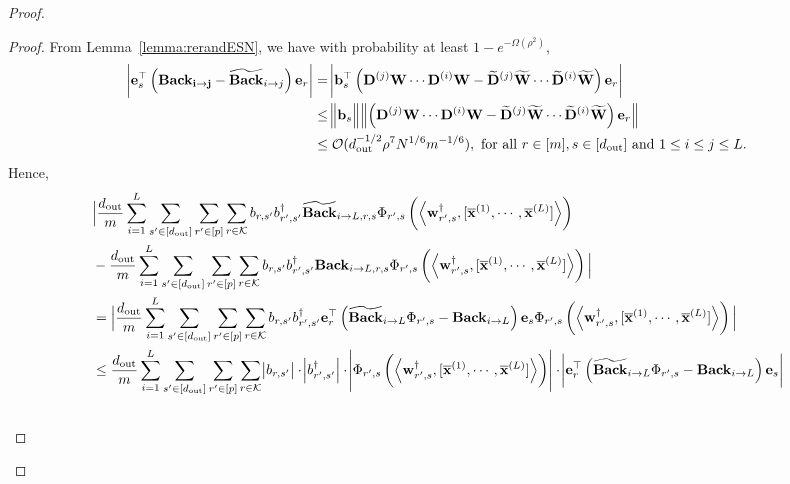 \begin{claim}
\begin{proof}
				\begin{proof}
					From Lemma~\ref{lemma:rerandESN}, we have with probability at least $1 - e^{-\Omega(\rho^2)}$,
					\begin{align*}
						\abs{\mathbf{e}_s^{\top} \left(\mathbf{Back_{i \to j}} - \widetilde{\mathbf{Back}}_{i \to j} \right) \mathbf{e}_r} 
						&= \abs{\mathbf{b}_s^{\top} \left( \mathbf{D}^{(j)} \mathbf{W} \cdots \mathbf{D}^{(i)} \mathbf{W} - \widetilde{\mathbf{D}}^{(j)} \widetilde{\mathbf{W}} \cdots \widetilde{\mathbf{D}}^{(i)} \widetilde{\mathbf{W}} \right) \mathbf{e}_r}
						\\&
						\le \norm[2]{\mathbf{b}_s} \norm[2]{\left( \mathbf{D}^{(j)} \mathbf{W} \cdots \mathbf{D}^{(i)} \mathbf{W} - \widetilde{\mathbf{D}}^{(j)} \widetilde{\mathbf{W}} \cdots \widetilde{\mathbf{D}}^{(i)} \widetilde{\mathbf{W}} \right) \mathbf{e}_r}
						\\&\le \mathcal{O}(d_{\mathrm{out}} ^{-1/2} \rho^7 N^{1/6} m^{-1/6}) , \text{ for all }  r \in [m], s \in [d_{\mathrm{out}} ] \text{ and } 1 \le i \le j \le L.
					\end{align*}
					Hence,
					\begingroup \allowdisplaybreaks
					\begin{align*}
						&\Big| \frac{\dout }{m} \sum_{i=1}^{L}  \sum_{s' \in [\dout ]} \sum_{r' \in [p]} \sum_{r \in \mathcal{K}}  b_{r, s'} b_{r', s'}^{\dagger} \widetilde{\mathbf{Back}}_{i \to L, r, s} \Phi_{r', s} \left(\left\langle \mathbf{w}_{r', s}^{\dagger}, [\overline{\mathbf{x}}^{(1)}, \cdots, \overline{\mathbf{x}}^{(L)}]\right\rangle\right) \\& - \frac{\dout }{m} \sum_{i=1}^{L}  \sum_{s' \in [\dout ]} \sum_{r' \in [p]} \sum_{r \in \mathcal{K}}  b_{r, s'} b_{r', s'}^{\dagger} \mathbf{Back}_{i \to L, r, s} \Phi_{r', s} \left(\left\langle \mathbf{w}_{r', s}^{\dagger}, [\overline{\mathbf{x}}^{(1)}, \cdots, \overline{\mathbf{x}}^{(L)}]\right\rangle\right) \Big|
						\\&
						= \Big| \frac{\dout }{m} \sum_{i=1}^{L}  \sum_{s' \in [\dout ]} \sum_{r' \in [p]} \sum_{r \in \mathcal{K}}  b_{r, s'} b_{r', s'}^{\dagger} \mathbf{e}_r^{\top} \left( \widetilde{\mathbf{Back}}_{i \to L} \Phi_{r', s} - \mathbf{Back}_{i \to L}\right) \mathbf{e}_s \Phi_{r', s} \left(\left\langle \mathbf{w}_{r', s}^{\dagger}, [\overline{\mathbf{x}}^{(1)}, \cdots, \overline{\mathbf{x}}^{(L)}]\right\rangle\right) \Big| \\&
						\le \frac{\dout }{m} \sum_{i=1}^{L}  \sum_{s' \in [\dout ]} \sum_{r' \in [p]} \sum_{r \in \mathcal{K}}  \abs{b_{r, s'}} \cdot \abs{b_{r', s'}^{\dagger}} \cdot  \abs{\Phi_{r', s} \left(\left\langle \mathbf{w}_{r', s}^{\dagger}, [\overline{\mathbf{x}}^{(1)}, \cdots, \overline{\mathbf{x}}^{(L)}]\right\rangle\right)} \cdot \abs{ \mathbf{e}_r^{\top} \left( \widetilde{\mathbf{Back}}_{i \to L} \Phi_{r', s} - \mathbf{Back}_{i \to L}\right) \mathbf{e}_s } \\&

\end{align*}
\end{proof}
\end{proof}
\end{claim}
